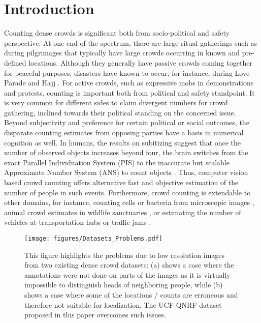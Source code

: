\documentclass[runningheads]{llncs}
\begin{document}
\section{Introduction}

Counting dense crowds is significant both from socio-political and safety perspective. At one end of the spectrum, there are large ritual gatherings such as during pilgrimages that typically have large crowds occurring in known and pre-defined locations. Although they generally have passive crowds coming together for peaceful purposes, disasters have known to occur, for instance, during Love Parade \cite{helbing_epjds_2012} and Hajj \cite{guardian_hajj_2006}. For active crowds, such as expressive mobs in demonstrations and protests, counting is important both from political and safety standpoint. It is very common for different sides to claim divergent numbers for crowd gathering, inclined towards their political standing on the concerned issue. Beyond subjectivity and preference for certain political or social outcomes, the disparate counting estimates from opposing parties have a basis in numerical cognition as well. In humans, the results on subitizing \cite{piazza2002subitizing} suggest that once the number of observed objects increases beyond four, the brain switches from the exact Parallel Individuation System (PIS) to the inaccurate but scalable Approximate Number System (ANS) to count objects \cite{hyde2011two}. Thus, computer vision based crowd counting offers alternative fast and objective estimation of the number of people in such events. Furthermore, crowd counting is extendable to other domains, for instance, counting cells or bacteria from microscopic images \cite{zisserman-nips10,sirinukunwattana2016locality}, animal crowd estimates in wildlife sanctuaries \cite{arteta2016counting}, or estimating the number of vehicles at transportation hubs or traffic jams \cite{onoro2016towards}.


\begin{figure}[t]
\centering
\texttt{[image: figures/Datasets\_Problems.pdf]}
\caption{{This figure highlights the problems due to low resolution images from two existing dense crowd datasets: (a) shows a case where the annotations were not done on parts of the images as it is virtually impossible to distinguish heads of neighboring people, while (b) shows a case where some of the locations / counts are erroneous and therefore not suitable for localization. The UCF-QNRF dataset proposed in this paper overcomes such issues.}}
\label{figDatasetsProblems}
\end{figure}
\end{document}
